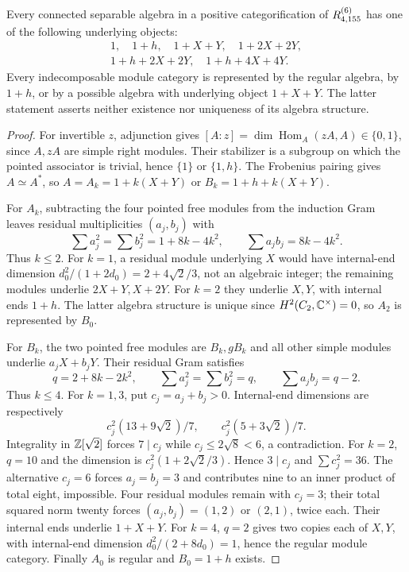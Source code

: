 \begin{proposition}\label{prop:r155-all-connected-algebras}
Every connected separable algebra in a positive categorification of
$R^{(6)}_{4,155}$ has one of the following underlying objects:
\[
\begin{gathered}
 1,\quad 1+h,\quad 1+X+Y,\quad 1+2X+2Y,\\
 1+h+2X+2Y,\quad 1+h+4X+4Y.
\end{gathered}
\]
Every indecomposable module category is represented by the regular algebra,
by $1+h$, or by a possible algebra with underlying object $1+X+Y$.
The latter statement asserts neither existence nor uniqueness of its
algebra structure.
\end{proposition}
\begin{proof}
For invertible $z$, adjunction gives
$[A:z]=\dim\operatorname{Hom}_A(zA,A)\in\{0,1\}$, since $A,zA$ are
simple right modules. Their stabilizer is a subgroup on which the
pointed associator is trivial, hence $\{1\}$ or $\{1,h\}$.
The Frobenius pairing gives $A\simeq A^*$, so
$A=A_k=1+k(X+Y)$ or $B_k=1+h+k(X+Y)$.

For $A_k$, subtracting the four pointed free modules from the induction
Gram leaves residual multiplicities $(a_j,b_j)$ with
\[
 \sum a_j^2=\sum b_j^2=1+8k-4k^2,\qquad
 \sum a_jb_j=8k-4k^2.
\]
Thus $k\le2$. For $k=1$, a residual module underlying $X$ would have
internal-end dimension $d_0^2/(1+2d_0)=2+4\sqrt2/3$, not an algebraic
integer; the remaining modules underlie $2X+Y,X+2Y$.
For $k=2$ they underlie $X,Y$, with internal ends $1+h$.
The latter algebra structure is unique since
$H^2(C_2,\mathbb C^\times)=0$, so $A_2$ is represented by $B_0$.

For $B_k$, the two pointed free modules are $B_k,gB_k$ and all other
simple modules underlie $a_jX+b_jY$. Their residual Gram satisfies
\[
 q=2+8k-2k^2,\qquad
 \sum a_j^2=\sum b_j^2=q,\qquad \sum a_jb_j=q-2.
\]
Thus $k\le4$. For $k=1,3$, put $c_j=a_j+b_j>0$.
Internal-end dimensions are respectively
\[
 c_j^2(13+9\sqrt2)/7,\qquad c_j^2(5+3\sqrt2)/7.
\]
Integrality in $\mathbb Z[\sqrt2]$ forces $7\mid c_j$ while
$c_j\le2\sqrt8<6$, a contradiction.
For $k=2$, $q=10$ and the dimension is $c_j^2(1+2\sqrt2/3)$.
Hence $3\mid c_j$ and $\sum c_j^2=36$.
The alternative $c_j=6$ forces $a_j=b_j=3$ and contributes nine to an
inner product of total eight, impossible. Four residual modules remain
with $c_j=3$; their total squared norm twenty forces $(a_j,b_j)=(1,2)$
or $(2,1)$, twice each. Their internal ends underlie $1+X+Y$.
For $k=4$, $q=2$ gives two copies each of $X,Y$, with internal-end
dimension $d_0^2/(2+8d_0)=1$, hence the regular module category.
Finally $A_0$ is regular and $B_0=1+h$ exists.
\end{proof}

